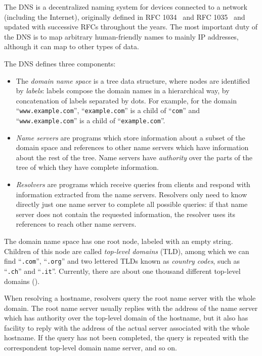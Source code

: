 \documentclass[mscthesis]{usiinfthesis}
\begin{document}
The DNS is a decentralized naming system for devices connected to a network (including the Internet), originally defined in RFC 1034~\cite{rfc:1034} and RFC 1035~\cite{rfc:1035} and updated with successive RFCs throughout the years. The most important duty of the DNS is to map arbitrary human-friendly names to mainly IP addresses, although it can map to other types of data.

The DNS defines three components:
\begin{itemize}
	\item The \emph{domain name space} is a tree data structure, where nodes are identified by \emph{labels}: labels compose the domain names in a hierarchical way, by concatenation of labels separated by dots. For example, for the domain ``\texttt{www.example.com}'', ``\texttt{example.com}'' is a child of ``\texttt{com}'' and ``\texttt{www.example.com}'' is a child of ``\texttt{example.com}''.
	\item \emph{Name servers} are programs which store information about a subset of the domain space and references to other name servers which have information about the rest of the tree. Name servers have \emph{authority} over the parts of the tree of which they have complete information.
	\item \emph{Resolvers} are programs which receive queries from clients and respond with information extracted from the name servers. Resolvers only need to know directly just one name server to complete all possible queries: if that name server does not contain the requested information, the resolver uses its references to reach other name servers.
\end{itemize}
The domain name space has one root node, labeled with an empty string. Children of this node are called \emph{top-level domains} (TLD), among which we can find ``\texttt{.com}'', ``\texttt{.org}'' and two lettered TLDs known as \emph{country codes}, such as ``\texttt{.ch}'' and ``\texttt{.it}''. Currently, there are about one thousand different top-level domains (\cite{website:tldlist}).

When resolving a hostname, resolvers query the root name server with the whole domain. The root name server usually replies with the address of the name server which has authority over the top-level domain of the hostname, but it also has facility to reply with the address of the actual server associated with the whole hostname. If the query has not been completed, the query is repeated with the correspondent top-level domain name server, and so on.
\end{document}
